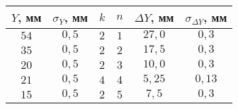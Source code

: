 \begin{tabular}{| c | c | c | c | c | c |}
\hline
$Y$, мм & $\sigma_Y$, мм & $k$ & $n$ & $\Delta Y$, мм & $\sigma_{\Delta Y}$, мм\\
\hline
$54$ & $0,5$ & $2$ & $1$ & $27,0$ & $0,3$\\
\hline
$35$ & $0,5$ & $2$ & $2$ & $17,5$ & $0,3$\\
\hline
$20$ & $0,5$ & $2$ & $3$ & $10,0$ & $0,3$\\
\hline
$21$ & $0,5$ & $4$ & $4$ & $5,25$ & $0,13$\\
\hline
$15$ & $0,5$ & $2$ & $5$ & $7,5$ & $0,3$\\
\hline
\end{tabular}
